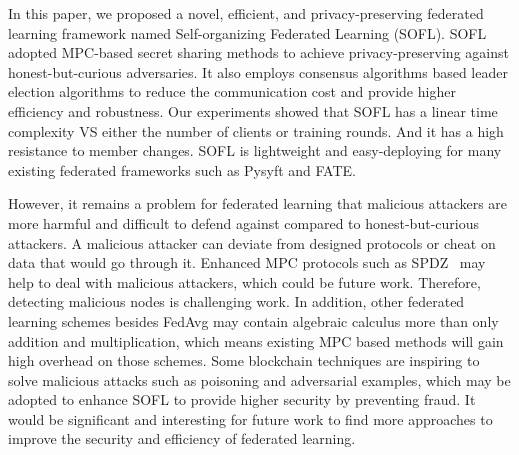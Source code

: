 In this paper, we proposed a novel, efficient, and privacy-preserving federated learning framework named Self-organizing Federated Learning (SOFL). SOFL adopted MPC-based secret sharing methods to achieve privacy-preserving against honest-but-curious adversaries. It also employs consensus algorithms based leader election algorithms to reduce the communication cost and provide higher efficiency and robustness. Our experiments showed that SOFL has a linear time complexity VS either the number of clients or training rounds. And it has a high resistance to member changes. SOFL is lightweight and easy-deploying for many existing federated frameworks such as Pysyft and FATE.

However, it remains a problem for federated learning that malicious attackers are more harmful and difficult to defend against compared to honest-but-curious attackers. A malicious attacker can deviate from designed protocols or cheat on data that would go through it. Enhanced MPC protocols such as SPDZ~\cite{SPDZ} may help to deal with malicious attackers, which could be future work. Therefore, detecting malicious nodes is challenging work. In addition, other federated learning schemes besides FedAvg may contain algebraic calculus more than only addition and multiplication, which means existing MPC based methods will gain high overhead on those schemes. Some blockchain techniques are inspiring to solve malicious attacks such as poisoning and adversarial examples, which may be adopted to enhance SOFL to provide higher security by preventing fraud. It would be significant and interesting for future work to find more approaches to improve the security and efficiency of federated learning.